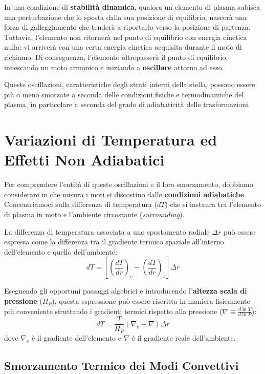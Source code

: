 In una condizione di \textbf{stabilità dinamica}, qualora un elemento di plasma subisca una perturbazione che lo sposta dalla sua posizione di equilibrio, nascerà una forza di galleggiamento che tenderà a riportarlo verso la posizione di partenza. Tuttavia, l'elemento non ritornerà nel punto di equilibrio con energia cinetica nulla: vi arriverà con una certa energia cinetica acquisita durante il moto di richiamo. Di conseguenza, l'elemento oltrepasserà il punto di equilibrio, innescando un moto armonico e iniziando a \textbf{oscillare} attorno ad esso.

Queste oscillazioni, caratteristiche degli strati interni della stella, possono essere più o meno smorzate a seconda delle condizioni fisiche e termodinamiche del plasma, in particolare a seconda del grado di adiabaticità delle trasformazioni.

\section{Variazioni di Temperatura ed Effetti Non Adiabatici}

Per comprendere l'entità di queste oscillazioni e il loro smorzamento, dobbiamo considerare in che misura i moti si discostino dalle \textbf{condizioni adiabatiche}. Concentriamoci sulla differenza di temperatura ($dT$) che si instaura tra l'elemento di plasma in moto e l'ambiente circostante (\textit{surrounding}).

La differenza di temperatura associata a uno spostamento radiale $\Delta r$ può essere espressa come la differenza tra il gradiente termico spaziale all'interno dell'elemento e quello dell'ambiente:
\begin{equation}
dT = \left[ \left(\frac{dT}{dr}\right)_e - \left(\frac{dT}{dr}\right)_s \right] \Delta r
\end{equation}

Eseguendo gli opportuni passaggi algebrici e introducendo l'\textbf{altezza scala di pressione} ($H_P$), questa espressione può essere riscritta in maniera fisicamente più conveniente sfruttando i gradienti termici rispetto alla pressione ($\nabla \equiv \frac{d\ln T}{d\ln P}$):
\begin{equation}
dT = \frac{T}{H_P} \left( \nabla_e - \nabla \right) \Delta r
\end{equation}
dove $\nabla_e$ è il gradiente dell'elemento e $\nabla$ è il gradiente reale dell'ambiente.

\subsection{Smorzamento Termico dei Modi Convettivi}

